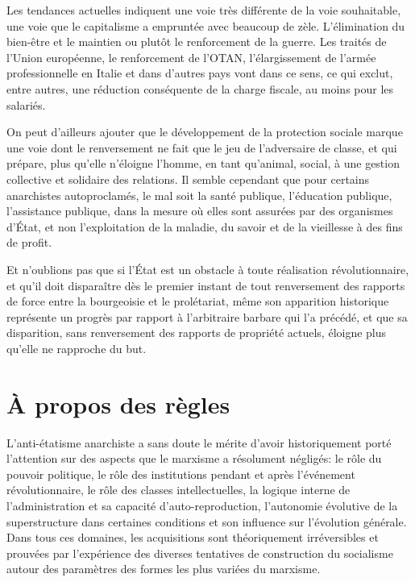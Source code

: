 Les tendances actuelles indiquent une voie très différente de la voie souhaitable, une voie que le capitalisme a empruntée avec beaucoup de zèle. L'élimination du bien-être et le maintien ou plutôt le renforcement de la guerre. Les traités de l'Union européenne, le renforcement de l'OTAN, l'élargissement de l'armée professionnelle en Italie et dans d'autres pays vont dans ce sens, ce qui exclut, entre autres, une réduction conséquente de la charge fiscale, au moins pour les salariés.

On peut d'ailleurs ajouter que le développement de la protection sociale marque une voie dont le renversement ne fait que le jeu de l'adversaire de classe, et qui prépare, plus qu'elle n'éloigne l'homme, en tant qu'animal, social, à une gestion collective et solidaire des relations. Il semble cependant que pour certains anarchistes autoproclamés, le mal soit la santé publique, l'éducation publique, l'assistance publique, dans la mesure où elles sont assurées par des organismes d'État, et non l'exploitation de la maladie, du savoir et de la vieillesse à des fins de profit.

Et n'oublions pas que si l'État est un obstacle à toute réalisation révolutionnaire, et qu'il doit disparaître dès le premier instant de tout renversement des rapports de force entre la bourgeoisie et le prolétariat, même son apparition historique représente un progrès par rapport à l'arbitraire barbare qui l'a précédé, et que sa disparition, sans renversement des rapports de propriété actuels, éloigne plus qu'elle ne rapproche du but.

\chapter{À propos des règles}

L'anti-étatisme anarchiste a sans doute le mérite d'avoir historiquement porté l'attention sur des aspects que le marxisme a résolument négligés: le rôle du pouvoir politique, le rôle des institutions pendant et après l'événement révolutionnaire, le rôle des classes intellectuelles, la logique interne de l'administration et sa capacité d'auto-reproduction, l'autonomie évolutive de la superstructure dans certaines conditions et son influence sur l'évolution générale. Dans tous ces domaines, les acquisitions sont théoriquement irréversibles et prouvées par l'expérience des diverses tentatives de construction du socialisme autour des paramètres des formes les plus variées du marxisme.

